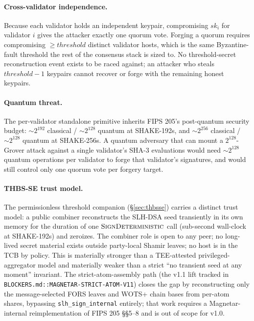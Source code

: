 \paragraph{Cross-validator independence.} Because each validator
holds an independent keypair, compromising $sk_i$ for validator $i$
gives the attacker exactly one quorum vote. Forging a quorum requires
compromising $\ge \mathit{threshold}$ distinct validator hosts, which
is the same Byzantine-fault threshold the rest of the consensus
stack is sized to. No threshold-secret reconstruction event exists
to be raced against; an attacker who steals $\mathit{threshold} - 1$
keypairs cannot recover or forge with the remaining honest keypairs.

\paragraph{Quantum threat.} The per-validator standalone primitive
inherits FIPS 205's post-quantum security budget: $\sim 2^{192}$
classical / $\sim 2^{128}$ quantum at SHAKE-192s, and
$\sim 2^{256}$ classical / $\sim 2^{128}$ quantum at SHAKE-256s. A
quantum adversary that can mount a $2^{128}$-Grover attack against
a single validator's SHA-3 evaluations would need $\sim 2^{128}$
quantum operations per validator to forge that validator's
signatures, and would still control only one quorum vote per
forgery target.

\paragraph{THBS-SE trust model.} The permissionless threshold
companion (\S\ref{sec:thbsse}) carries a distinct trust model: a
public combiner reconstructs the SLH-DSA seed transiently in its
own memory for the duration of one
$\textsc{SignDeterministic}$ call (sub-second wall-clock at
SHAKE-192s) and zeroizes. The combiner role is open to any peer;
no long-lived secret material exists outside party-local Shamir
leaves; no host is in the TCB by policy. This is materially
stronger than a TEE-attested privileged-aggregator model and
materially weaker than a strict ``no transient seed at any moment''
invariant. The strict-atom-assembly path (the v1.1 lift tracked in
\texttt{BLOCKERS.md::MAGNETAR-STRICT-ATOM-V11}) closes the gap by
reconstructing only the message-selected FORS leaves and WOTS+
chain bases from per-atom shares, bypassing
\texttt{slh\_sign\_internal} entirely; that work requires a
Magnetar-internal reimplementation of FIPS 205 \S\S 5--8 and is
out of scope for v1.0.

